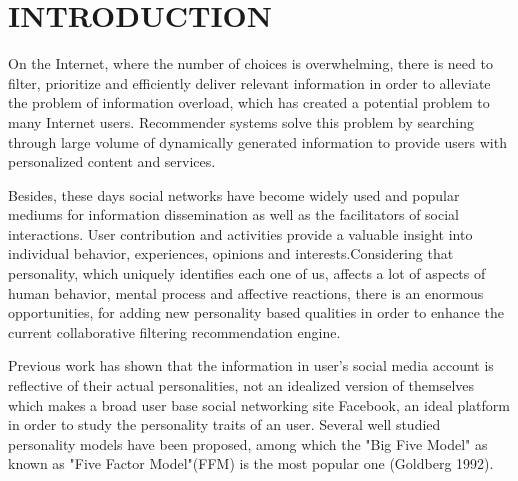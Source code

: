 \newpage
{}
\section{INTRODUCTION}
On the Internet, where the number of choices is overwhelming, there is need to filter, prioritize and efficiently deliver relevant information in order to alleviate the problem of information overload, which has created a potential problem to many Internet users. Recommender systems solve this problem by searching through large volume of dynamically generated information to provide users with personalized content and services.

Besides, these days social networks have become widely used and popular mediums for information dissemination as well as the facilitators of social interactions. User contribution and activities provide a valuable insight into individual behavior, experiences, opinions and interests.Considering that personality, which uniquely identifies each one of us, affects a lot of aspects of human behavior, mental process and affective reactions, there is an enormous opportunities, for adding new personality based qualities in order to enhance the current collaborative filtering recommendation engine.

Previous work has shown that the information in user's social media account is reflective of their actual personalities, not an idealized version of themselves which makes a broad user base social networking site Facebook, an ideal platform in order to study the personality traits of an user. Several well studied personality models have been proposed, among which the "Big Five Model" as known as "Five Factor Model"(FFM) is the most popular one (Goldberg 1992)\cite{fivefactormodel}.

